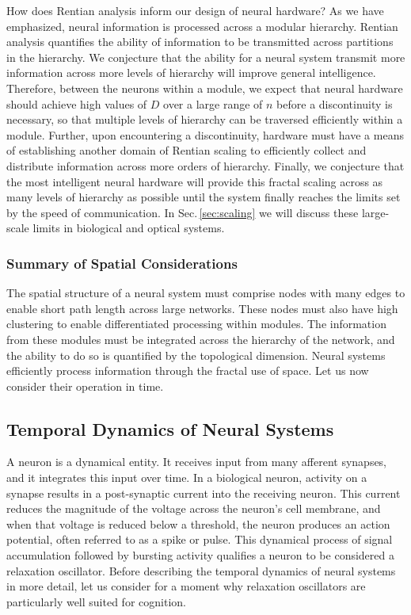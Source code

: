 \documentclass[twocolumn]{article}
\begin{document}
How does Rentian analysis inform our design of neural hardware? As we have emphasized, neural information is processed across a modular hierarchy. Rentian analysis quantifies the ability of information to be transmitted across partitions in the hierarchy. We conjecture that the ability for a neural system transmit more information across more levels of hierarchy will improve general intelligence. Therefore, between the neurons within a module, we expect that neural hardware should achieve high values of $D$ over a large range of $n$ before a discontinuity is necessary, so that multiple levels of hierarchy can be traversed efficiently within a module. Further, upon encountering a discontinuity, hardware must have a means of establishing another domain of Rentian scaling to efficiently collect and distribute information across more orders of hierarchy. Finally, we conjecture that the most intelligent neural hardware will provide this fractal scaling across as many levels of hierarchy as possible until the system finally reaches the limits set by the speed of communication. In Sec.\,\ref{sec:scaling} we will discuss these large-scale limits in biological and optical systems.

\subsubsection{Summary of Spatial Considerations}
The spatial structure of a neural system must comprise nodes with many edges to enable short path length across large networks. These nodes must also have high clustering to enable differentiated processing within modules. The information from these modules must be integrated across the hierarchy of the network, and the ability to do so is quantified by the topological dimension. Neural systems efficiently process information through the fractal use of space. Let us now consider their operation in time.

\subsection{Temporal Dynamics of Neural Systems}
A neuron is a dynamical entity. It receives input from many afferent synapses, and it integrates this input over time. In a biological neuron, activity on a synapse results in a post-synaptic current into the receiving neuron. This current reduces the magnitude of the voltage across the neuron's cell membrane, and when that voltage is reduced below a threshold, the neuron produces an action potential, often referred to as a spike or pulse. This dynamical process of signal accumulation followed by bursting activity qualifies a neuron to be considered a relaxation oscillator. Before describing the temporal dynamics of neural systems in more detail, let us consider for a moment why relaxation oscillators are particularly well suited for cognition.
\end{document}
